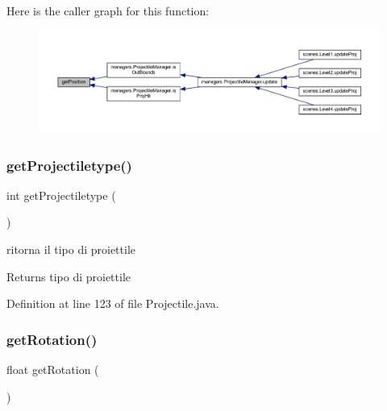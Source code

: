 Here is the caller graph for this function\+:
\nopagebreak
\begin{figure}[H]
\begin{center}
\leavevmode
\includegraphics[width=350pt]{classobjects_1_1_projectile_a6b73c36e7bd98fd9cfbffa2ff11cc10e_icgraph}
\end{center}
\end{figure}
\mbox{\label{classobjects_1_1_projectile_a2dbf5e3a5bf7a6d90d11cb469b59776b}} 
\subsubsection{\texorpdfstring{get\+Projectiletype()}{getProjectiletype()}}
{\footnotesize\ttfamily int get\+Projectiletype (\begin{DoxyParamCaption}{ }\end{DoxyParamCaption})}



ritorna il tipo di proiettile 

\begin{DoxyReturn}{Returns}
tipo di proiettile 
\end{DoxyReturn}


Definition at line 123 of file Projectile.\+java.

\mbox{\label{classobjects_1_1_projectile_aa60864de0b3c57fee5ae403229f41228}} 
\subsubsection{\texorpdfstring{get\+Rotation()}{getRotation()}}
{\footnotesize\ttfamily float get\+Rotation (\begin{DoxyParamCaption}{ }\end{DoxyParamCaption})}



